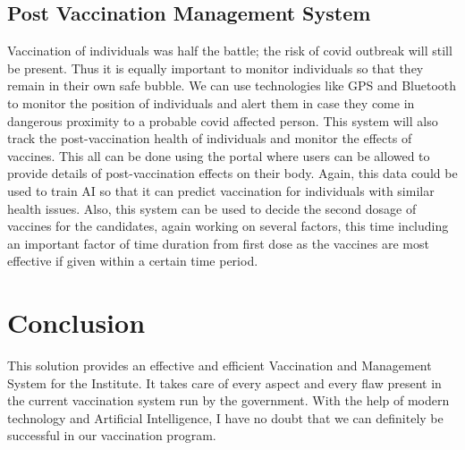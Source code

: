 \documentclass[10pt,twocolumn,letterpaper]{article}
\begin{document}
\subsection{Post Vaccination Management System}

Vaccination of individuals was half the battle; the risk of covid outbreak will still be present. Thus it is equally important to monitor individuals so that they remain in their own safe bubble. We can use technologies like GPS and Bluetooth to monitor the position of individuals and alert them in case they come in dangerous proximity to a probable covid affected person. This system will also track the post-vaccination health of individuals and monitor the effects of vaccines. This all can be done using the portal where users can be allowed to provide details of post-vaccination effects on their body. Again, this data could be used to train AI so that it can predict vaccination for individuals with similar health issues. Also, this system can be used to decide the second dosage of vaccines for the candidates, again working on several factors, this time including an important factor of time duration from first dose as the vaccines are most effective if given within a certain time period.

\section{Conclusion}
This solution provides an effective and efficient Vaccination and Management System for the Institute. It takes care of every aspect and every flaw present in the current vaccination system run by the government. With the help of modern technology and Artificial Intelligence, I have no doubt that we can definitely be successful in our vaccination program. 
\end{document}
